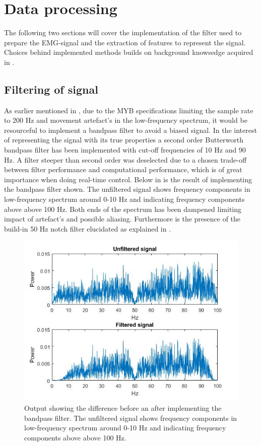 

\section{Data processing}

The following two sections will cover the implementation of the filter used to prepare the EMG-signal and the extraction of features to represent the signal. Choices behind implemented methods builds on background knowsedge acquired in . 


\subsection{Filtering of signal} \label{sub:prePros} 

As earlier mentioned in , due to the MYB specifications limiting the sample rate to 200 Hz and movement artefact's in the low-frequency spectrum, it would be resourceful to implement a bandpass filter to avoid a biased signal.
In the interest of representing the signal with its true properties a second order Butterworth bandpass filter has been implemented with cut-off frequencies of 10 Hz and 90 Hz. A filter steeper than second order was deselected due to a chosen trade-off between filter performance and computational performance, which is of great importance when doing real-time control. Below in  is the result of implementing the bandpass filter shown. The unfiltered signal shows frequency components in low-frequency spectrum around 0-10 Hz and indicating frequency components above above 100 Hz. Both ends of the spectrum has been dampened limiting impact of artefact's and possible aliasing. Furthermore is the presence of the build-in 50 Hz notch filter elucidated as explained in .     


\begin{figure}[H]                 
	\includegraphics[width=.8\textwidth]{figures/pMethods/Filt}  
	\caption{Output showing the difference before an after implementing the bandpass filter. The unfiltered signal shows frequency components in low-frequency spectrum around 0-10 Hz and indicating frequency components above above 100 Hz.}
	\label{fig:filt} 
\end{figure}





